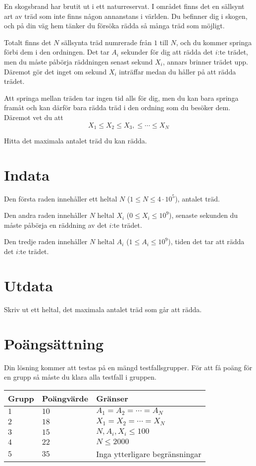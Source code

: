 
En skogsbrand har brutit ut i ett naturreservat. I området finns det en sällsynt art av träd
som inte finns någon annanstans i världen. Du befinner dig i skogen, och på din väg hem tänker du försöka rädda så många träd som möjligt.

Totalt finns det $N$ sällsynta träd numrerade från $1$ till $N$, och du kommer springa förbi dem i den ordningen. 
Det tar $A_i$ sekunder för dig att rädda det $i$:te trädet, men du måste påbörja räddningen
senast sekund $X_i$, annars brinner trädet upp. Däremot gör det inget om sekund $X_i$ inträffar medan
du håller på att rädda trädet.

Att springa mellan träden tar ingen tid alls för dig, men du kan bara springa framåt och kan därför
bara rädda träd i den ordning som du besöker dem. Däremot vet du att
$$X_1 \leq X_2 \leq X_3, \leq \cdots \leq X_N$$

Hitta det maximala antalet träd du kan rädda.

\section*{Indata}

Den första raden innehåller ett heltal $N$ ($1 \leq N \leq 4 \cdot 10^5$), antalet träd.

Den andra raden innehåller $N$ heltal $X_i$ ($0 \leq X_i \leq 10^9$), senaste sekunden du måste
påbörja en räddning av det $i$:te trädet.

Den tredje raden innehåller $N$ heltal $A_i$ ($1 \leq A_i \leq 10^9$), tiden det tar att rädda det 
$i$:te trädet.

\section*{Utdata}
Skriv ut ett heltal, det maximala antalet träd som går att rädda.

\section*{Poängsättning}
Din lösning kommer att testas på en mängd testfallsgrupper.
För att få poäng för en grupp så måste du klara alla testfall i gruppen.

\noindent
\begin{tabular}{| l | l | p{12cm} |}
  \hline
  Grupp & Poängvärde & Gränser \\ \hline
  $1$   & $10$       & $A_1 = A_2 = \cdots = A_N$\\ \hline
  $2$   & $18$       & $X_1 = X_2 = \cdots = X_N$  \\ \hline
  $3$   & $15$       & $N, A_i, X_i \leq 100$ \\ \hline
  $4$   & $22$       & $N \leq 2000$ \\ \hline
  $5$   & $35$       & Inga ytterligare begränsningar \\ \hline
\end{tabular}
